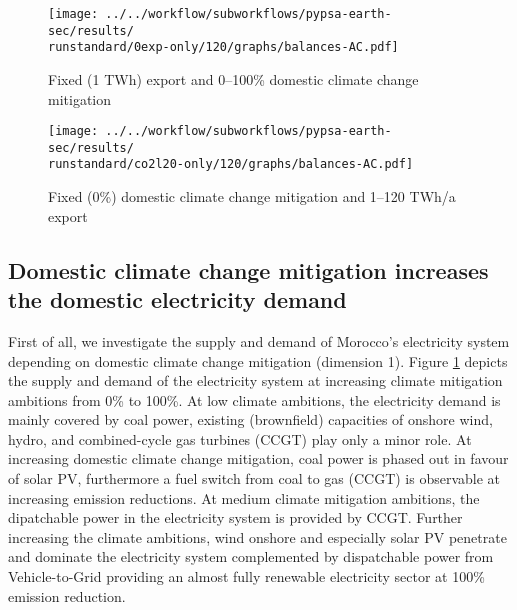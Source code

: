 
\begin{figure*}[h!]
    \centering
    \begin{subfigure}[b]{0.49\linewidth}
        \centering
        \texttt{[image: ../../workflow/subworkflows/pypsa-earth-sec/results/\\runstandard/0exp-only/120/graphs/balances-AC.pdf]}
        \caption{Fixed (1 TWh) export and 0--100\% domestic climate change mitigation}
        \label{fig:balances-ac-0exp-120}
    \end{subfigure}
    \hfill
    \begin{subfigure}[b]{0.49\linewidth}
        \centering
        \texttt{[image: ../../workflow/subworkflows/pypsa-earth-sec/results/\\runstandard/co2l20-only/120/graphs/balances-AC.pdf]}
        \caption{Fixed (0\%) domestic climate change mitigation and 1--120 TWh/a export}
        \label{fig:balances-ac-co2l20-120}
    \end{subfigure}
    \hfill
    \caption{Electricity supply and demand at fixed export levels and increasing domestic climate change mitigation (\ref{fig:balances-ac-0exp-120}) and vice versa (\ref{fig:balances-ac-co2l20-120}). Increasing domestic climate change mitigation first phases out carbon-intensive coal generation in favor of CCGT, at medium to high domestic climate change mitigation the electricity system is fully renewable supported by flexibility through Vehicle-to-Grid (V2G) and sector coupling. Increasing electricity demands include Battery Electric Vehicles (BEV) and hydrogen generation for other sectors.
    At increasing hydrogen exports the additional electricity required for hydrogen electrolysis is covered by onshore wind and solar PV, as imposed by the temporal hydrogen regulation. 
    }
    \label{fig:balances-ac}
\end{figure*}


\subsection*{Domestic climate change mitigation increases the domestic electricity demand}
\label{subsec:increase_limit}
First of all, we investigate the supply and demand of Morocco's electricity system depending on domestic climate change mitigation (dimension 1). Figure \ref{fig:balances-ac-0exp-120} depicts the supply and demand of the electricity system at increasing climate mitigation ambitions from 0\% to 100\%. At low climate ambitions, the electricity demand is mainly covered by coal power, existing (brownfield) capacities of onshore wind, hydro, and combined-cycle gas turbines (CCGT) play only a minor role. 
At increasing domestic climate change mitigation, coal power is phased out in favour of solar PV, furthermore a fuel switch from coal to gas (CCGT) is observable at increasing emission reductions. At medium climate mitigation ambitions, the dipatchable power in the electricity system is provided by CCGT. 
Further increasing the climate ambitions, wind onshore and especially solar PV penetrate and dominate the electricity system complemented by dispatchable power from Vehicle-to-Grid providing an almost fully renewable electricity sector at 100\% emission reduction. 

